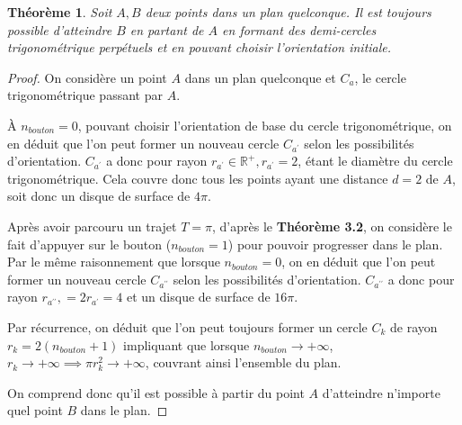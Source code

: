 \documentclass{amsart}
\newtheorem{theorem}{Théorème}[section]
\theoremstyle{definition}
\theoremstyle{remark}
\numberwithin{equation}{section}
\begin{document}
\begin{theorem}
  Soit $A,B$ deux points dans un plan quelconque. Il est toujours possible d'atteindre $B$ en partant de $A$ en formant des demi-cercles trigonométrique perpétuels et en pouvant choisir l'orientation initiale.
\end{theorem}

\begin{proof}
  On considère un point $A$ dans un plan quelconque et $C_a$, le cercle trigonométrique passant par $A$.

  À $n_{bouton}=0$, pouvant choisir l'orientation de base du cercle trigonométrique, on en déduit que l'on peut former un nouveau cercle $C_{a^\prime}$ selon les possibilités d'orientation.  $C_{a^\prime}$ a donc pour rayon $r_{a^\prime}\in\mathbb{R^+}, r_{a^\prime}=2$, étant le
  diamètre du cercle trigonométrique. Cela couvre donc tous les points ayant une distance $d=2$ de $A$, soit donc un disque de surface de $4\pi$.

  Après avoir parcouru un trajet $T=\pi$, d'après le \textbf{Théorème 3.2}, on considère le fait d'appuyer sur le bouton ($n_{bouton}=1$) pour pouvoir progresser dans le plan. Par le même raisonnement que lorsque $n_{bouton}=0$,
  on en déduit que l'on peut former un nouveau cercle $C_{a^{\prime\prime}}$ selon les possibilités d'orientation.  $C_{a^{\prime\prime}}$ a donc pour rayon $r_{a^{\prime\prime}},=2r_{a^\prime}=4$ et un disque de surface de $16\pi$.

  Par récurrence, on déduit que l'on peut toujours former un cercle $C_k$ de rayon $r_k=2(n_{bouton}+1)$ impliquant que lorsque $n_{bouton}\to+\infty$, $r_k\to+\infty \implies {\pi}r_k^2\to+\infty$, couvrant ainsi l'ensemble du plan.

  On comprend donc qu'il est possible à partir du point $A$ d'atteindre n'importe quel point $B$ dans le plan.



\end{proof}
\end{document}
